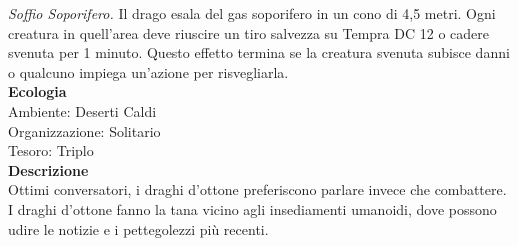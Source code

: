\begin{multicols}{2}
\emph{Soffio Soporifero.} Il drago esala del gas soporifero in un cono di 4,5 metri. Ogni creatura in quell'area deve riuscire un tiro salvezza su Tempra DC  12 o cadere svenuta per 1 minuto. Questo effetto termina se la creatura svenuta subisce danni o qualcuno impiega un'azione per risvegliarla.\\
\textbf{Ecologia}\\
Ambiente: Deserti Caldi\\
Organizzazione: Solitario\\
Tesoro: Triplo\\
\textbf{Descrizione}\\
Ottimi conversatori, i draghi d'ottone preferiscono parlare invece che combattere. I draghi d'ottone fanno la tana vicino agli insediamenti umanoidi, dove possono udire le notizie e i pettegolezzi più recenti.\\



\end{multicols}
